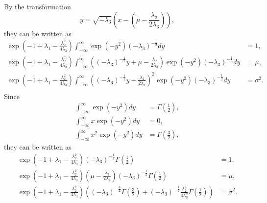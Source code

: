 %
By the transformation
%
\begin{equation}
y = \sqrt{- \lambda_3} \left( x - \left( \mu - \frac{\lambda_2}{2 \lambda_3} \right) \right),
\end{equation}
%
they can be written as
%
\begin{equation}
\begin{aligned}
\exp \left( - 1 + \lambda_1 - \frac{\lambda_2 ^ 2}{4 \lambda_3} \right) \int_{- \infty}^{\infty} \exp \left( - y ^ 2 \right) (- \lambda_3) ^ {- \frac{1}{2}} dy &= 1,\\
\exp \left( - 1 + \lambda_1 - \frac{\lambda_2 ^ 2}{4 \lambda_3} \right) \int_{- \infty}^{\infty} \left( (- \lambda_3) ^ {- \frac{1}{2}} y + \mu - \frac{\lambda_2}{2 \lambda_3} \right) \exp \left( - y ^ 2 \right) (- \lambda_3) ^ {- \frac{1}{2}} dy &= \mu,\\
\exp \left( - 1 + \lambda_1 - \frac{\lambda_2 ^ 2}{4 \lambda_3} \right) \int_{- \infty}^{\infty} \left( (- \lambda_3) ^ {- \frac{1}{2}} y - \frac{\lambda_2}{2 \lambda_3} \right) ^ 2 \exp \left( - y ^ 2 \right) (- \lambda_3) ^ {- \frac{1}{2}} dy &= \sigma ^ 2.\\
\end{aligned}
\end{equation}
%
Since
%
\begin{equation}
\begin{aligned}
\int_{- \infty}^{\infty} \exp \left( - y ^ 2 \right) dy &= \Gamma \left( \frac{1}{2} \right), \\
\int_{- \infty}^{\infty} x \exp \left( - y ^ 2 \right) dy &= 0, \\
\int_{- \infty}^{\infty} x ^ 2 \exp \left( - y ^ 2 \right) dy &= \Gamma \left( \frac{3}{2} \right),
\end{aligned}
\end{equation}
%
they can be written as
%
\begin{equation}
\begin{aligned}
\exp \left( - 1 + \lambda_1 - \frac{\lambda_2 ^ 2}{4 \lambda_3} \right) (- \lambda_3) ^ {- \frac{1}{2}} \Gamma \left( \frac{1}{2} \right) &= 1, \\
\exp \left( - 1 + \lambda_1 - \frac{\lambda_2 ^ 2}{4 \lambda_3} \right) \left( \mu - \frac{\lambda_2}{2 \lambda_3} \right) (- \lambda_3) ^ {- \frac{1}{2}} \Gamma \left( \frac{1}{2} \right) &= \mu, \\
\exp \left( - 1 + \lambda_1 - \frac{\lambda_2 ^ 2}{4 \lambda_3} \right) \left( (- \lambda_3) ^ {- \frac{3}{2}} \Gamma \left( \frac{3}{2} \right) + (- \lambda_3) ^ {- \frac{1}{2}} \frac{\lambda_2 ^ 2}{4 \lambda_3 ^ 2} \Gamma \left( \frac{1}{2} \right) \right) &= \sigma ^ 2.
\end{aligned}
\end{equation}
